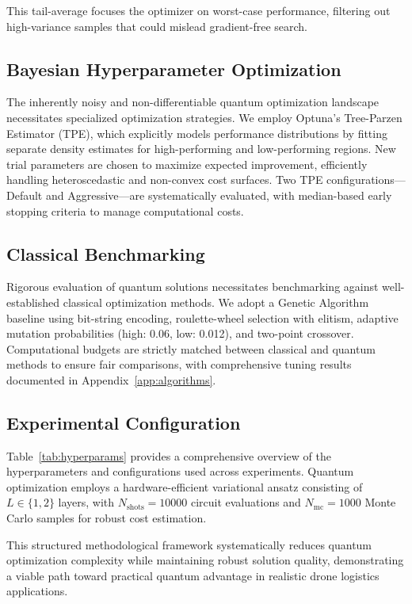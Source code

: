 This tail-average focuses the optimizer on worst-case performance, filtering out high-variance samples that could mislead gradient-free search.

\subsection{Bayesian Hyperparameter Optimization}

The inherently noisy and non-differentiable quantum optimization landscape necessitates specialized optimization strategies. We employ Optuna's Tree-Parzen Estimator (TPE), which explicitly models performance distributions by fitting separate density estimates for high-performing and low-performing regions. New trial parameters are chosen to maximize expected improvement, efficiently handling heteroscedastic and non-convex cost surfaces. Two TPE configurations---Default and Aggressive---are systematically evaluated, with median-based early stopping criteria to manage computational costs.

\subsection{Classical Benchmarking}

Rigorous evaluation of quantum solutions necessitates benchmarking against well-established classical optimization methods. We adopt a Genetic Algorithm baseline using bit-string encoding, roulette-wheel selection with elitism, adaptive mutation probabilities (high: 0.06, low: 0.012), and two-point crossover. Computational budgets are strictly matched between classical and quantum methods to ensure fair comparisons, with comprehensive tuning results documented in Appendix~\ref{app:algorithms}.

\subsection{Experimental Configuration}

Table~\ref{tab:hyperparams} provides a comprehensive overview of the hyperparameters and configurations used across experiments. Quantum optimization employs a hardware-efficient variational ansatz consisting of $L \in \{1,2\}$ layers, with $N_{\text{shots}}=10000$ circuit evaluations and $N_{\text{mc}}=1000$ Monte Carlo samples for robust cost estimation.

This structured methodological framework systematically reduces quantum optimization complexity while maintaining robust solution quality, demonstrating a viable path toward practical quantum advantage in realistic drone logistics applications.

